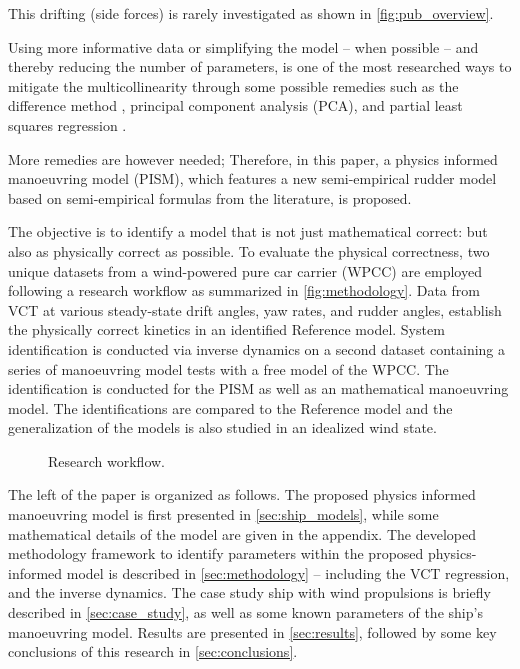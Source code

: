 This drifting (side forces) is rarely investigated as shown in \autoref{fig:pub_overview}.

Using more informative data or simplifying the model -- when possible -- and thereby reducing the number of parameters, is one of the most researched ways to mitigate the multicollinearity through some possible remedies such as the difference method \citep{luo_parameter_2016}, principal component analysis (PCA), and partial least squares regression \citep{jian-chuan_parametric_2015}. 


More remedies are however needed; Therefore, in this paper, a physics informed manoeuvring model (PISM), which features a new semi-empirical rudder model based on semi-empirical formulas from the literature, is proposed.

The objective is to identify a model that is not just mathematical correct: but also as physically correct as possible.
To evaluate the physical correctness, two unique datasets from a wind-powered pure car carrier (WPCC) are employed following a research workflow as summarized in \autoref{fig:methodology}.
Data from VCT at various steady-state drift angles, yaw rates, and rudder angles, establish the physically correct kinetics in an identified Reference model. 
System identification is conducted via inverse dynamics \citep{faber_inverse_2018} on a second dataset containing a series of manoeuvring model tests with a free model of the WPCC. The identification is conducted for the PISM as well as an mathematical manoeuvring model. The identifications are compared to the Reference model and the generalization of the models is also studied in an idealized wind state.
%
\begin{figure}[h]
    \centering
    
    \caption{Research workflow.}
    \label{fig:methodology}
\end{figure}

The left of the paper is organized as follows. The proposed physics informed manoeuvring model is first presented in \autoref{sec:ship_models}, while some mathematical details of the model are given in the appendix. 
The developed methodology framework to identify parameters within the proposed physics-informed model is described in \autoref{sec:methodology} -- including the VCT regression, and the inverse dynamics. The case study ship with wind propulsions is briefly described in \autoref{sec:case_study}, as well as some known parameters of the ship's manoeuvring model. Results are presented in \autoref{sec:results}, followed by some key conclusions of this research in \autoref{sec:conclusions}.